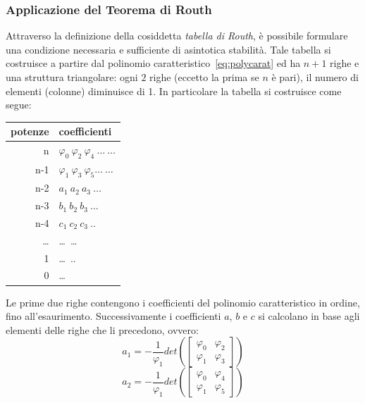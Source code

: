 \documentclass[a4paper]{report}
\begin{document}
\subsubsection{Applicazione del Teorema di Routh}
Attraverso la definizione della cosiddetta {\em tabella di Routh},
\`e possibile formulare una condizione necessaria e sufficiente di
asintotica stabilit\`a. 
Tale tabella si costruisce a partire dal polinomio
caratteristico~\ref{eq:polycarat} ed ha $n + 1$ righe e una struttura
triangolare: ogni $2$ righe (eccetto la prima se $n$ \`e
pari), il numero di elementi (colonne) diminuisce di 1. 
In particolare la tabella si costruisce come segue:\\
\begin{center}
  \begin{tabular}{|r|l|}
    \hline
    potenze & coefficienti\\
    \hline
    n &
    $\varphi_0  ~\varphi_2 ~\varphi_4 ~\ldots ~\ldots$\\
    n-1 &
    $\varphi_1 ~\varphi_3  ~ \varphi_5  \ldots~\ldots$\\n-2 &
    $a_1 ~a_2 ~a_3 ~\ldots$\\
    n-3&
    $b_1 ~b_2 ~b_3 ~\ldots$\\
    n-4&
    $c_1 ~c_2 ~c_3 ~..$\\
    \ldots &\ldots ~\ldots\\
    1 &\ldots ~..\\
    0 & \ldots
  \end{tabular}
\end{center}
Le prime due righe contengono i coefficienti del polinomio
caratteristico in ordine, fino all'esaurimento. Successivamente i
coefficienti $a$, $b$ e $c$ si calcolano in base agli elementi delle
righe che li precedono, ovvero:
\begin{equation}
  a_1=-\frac{1}{\varphi_1}det\left(\left[
    \begin{array}{cc}
      \varphi_0 & \varphi_{2} \\
      \varphi_1&\varphi_{3}
    \end{array}
    \right]\right)
\end{equation}
\begin{equation}
  a_2=-\frac{1}{\varphi_1}det\left(\left[
    \begin{array}{cc}
      \varphi_0 & \varphi_4 \\
      \varphi_1 &\varphi_5
    \end{array}
    \right]\right)
\end{equation}
\end{document}
